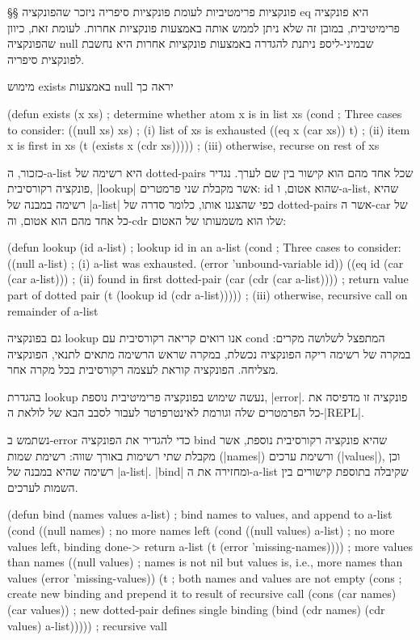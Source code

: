 §§ פונקציות פרימטיביות לעומת פונקציות סיפריה
ניזכר שהפונקציה eq היא פונקציה פרימיטיבית, במובן זה שלא ניתן לממש אותה באמצעות
פונקציות אחרות. לעומת זאת, כיוון שהפונקציה null שבמיני-ליספ ניתנת להגדרה
באמצעות פונקציות אחרות היא נחשבת לפונקצית סיפריה.

מימוש exists באמצעות null יראה כך
\begin{KERNEL}
(defun exists (x xs) ; determine whether atom x is in list xs
  (cond ; Three cases to consider:
    ((null xs) xs) ; (i) list of xs is exhausted
    ((eq x (car xs)) t) ; (ii) item x is first in xs
    (t (exists x (cdr xs))))) ; (iii) otherwise, recurse on rest of xs
\end{KERNEL}

כזכור, ה-a-list היא רשימה של dotted-pairs שכל אחד מהם הוא קישור בין שם לערך.
נגדיר פונקציה רקורסיבית, \E|lookup| אשר מקבלת שני פרמטרים: id שהוא אטום,
ו-a-list, שהיא רשימה במבנה של \E|a-list| כפי שהצגנו אותו, כלומר סדרה של
dotted-pairs אשר ה-car של כל אחד מהם הוא אטום, וה-cdr שלו הוא משמעותו של האטום:
\begin{KERNEL}
(defun lookup (id a-list) ; lookup id in an a-list
  (cond ; Three cases to consider:
    ((null a-list) ; (i) a-list was exhausted.
      (error 'unbound-variable id))
    ((eq id (car (car a-list))) ; (ii) found in first dotted-pair
      (car (cdr (car a-list)))) ; return value part of dotted pair
    (t (lookup id (cdr a-list))))) ; (iii) otherwise, recursive call on remainder of a-list
\end{KERNEL}
גם בפונקציה lookup אנו רואים קריאה רקורסיבית עם cond המתפצל לשלושה מקרים: במקרה
של רשימה ריקה הפונקציה נכשלת, במקרה שראש הרשימה מתאים לתנאי, הפונקציה מצליחה.
הפונקציה קוראת לעצמה רקורסיבית בכל מקרה אחר.

בהגדרת lookup נעשה שימוש בפונקציה פרימיטיבית נוספת, \E|error|. פונקציה זו
מדפיסה את כל הפרמטרים שלה וגורמת לאינטרפרטר לעבור לסבב הבא של לולאת ה-\E|REPL|.

נשתמש ב-error כדי להגדיר את הפונקציה bind שהיא פונקציה רקורסיבית נוספת, אשר
מקבלת שתי רשימות באורך שווה: רשימת שמות (\E|names|) ורשימת ערכים (\E|values|),
וכן רשימה שהיא במבנה של \E|a-list|. \E|bind| ומחזירה את ה-a-list
שקיבלה בתוספת קישורים בין השמות לערכים.

\begin{KERNEL}
(defun bind (names values a-list) ; bind names to values, and append to a-list
  (cond ((null names) ; no more names left
        (cond ((null values) a-list) ; no more values left, binding done-> return a-list
              (t (error 'missing-names)))) ; more values than names
        ((null values) ; names is not nil but values is, i.e., more names than values
          (error 'missing-values))
        (t ; both names and values are not empty
          (cons ; create new binding and prepend it to result of recursive call
            (cons (car names) (car values)) ; new dotted-pair defines single binding
            (bind (cdr names) (cdr values) a-list))))) ; recursive vall
\end{KERNEL}


